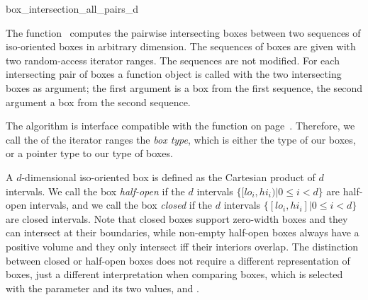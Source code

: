 

\begin{ccRefFunction}{box_intersection_all_pairs_d}

\ccDefinition
  
The function \ccRefName\ computes the pairwise intersecting boxes
between two sequences of iso-oriented boxes in arbitrary dimension.
The sequences of boxes are given with two random-access iterator
ranges. The sequences are not modified. For each intersecting pair of
boxes a  function object is called with the two
intersecting boxes as argument; the first argument is a box from the
first sequence, the second argument a box from the second sequence.

The algorithm is interface compatible with the 
function on page~. Therefore, we
call the  of the iterator ranges the \emph{box type},
which is either the type of our boxes, or a pointer type to our type
of boxes. 

A $d$-dimensional iso-oriented box is defined as the Cartesian product
of $d$ intervals. We call the box \emph{half-open} if the $d$
intervals $\{ [lo_i,hi_i) | 0 \leq i < d\}$ are half-open intervals,
and we call the box \emph{closed} if the $d$ intervals $\{ [lo_i,hi_i]
| 0 \leq i < d\}$ are closed intervals. Note that closed boxes support
zero-width boxes and they can intersect at their boundaries, while
non-empty half-open boxes always have a positive volume and they only
intersect iff their interiors overlap.  The distinction between closed
or half-open boxes does not require a different representation of
boxes, just a different interpretation when comparing boxes, which is
selected with the  parameter and its two values,
 and
.


\end{ccRefFunction}
